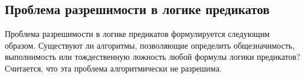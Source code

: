 \subsection{Проблема разрешимости в логике предикатов}

Проблема разрешимости в логике предикатов формулируется следующим образом. Существуют ли алгоритмы, позволяющие определить общезначимость, выполнимость или тождественную ложность любой формулы логики предикатов? Считается, что эта проблема алгоритмически не разрешима.
